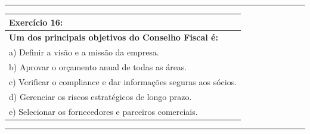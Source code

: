\documentclass[
]{book}
\begin{document}
\begin{center}\rule{0.5\linewidth}{0.5pt}\end{center}

\begin{longtable}[]{@{}l@{}}
\toprule\noalign{}
\textbf{Exercício 16:} \\
\midrule\noalign{}
\endhead
\bottomrule\noalign{}
\endlastfoot
\textbf{Um dos principais objetivos do Conselho Fiscal é:} \\
a) Definir a visão e a missão da empresa. \\
b) Aprovar o orçamento anual de todas as áreas. \\
c) Verificar o compliance e dar informações seguras aos sócios. \\
d) Gerenciar os riscos estratégicos de longo prazo. \\
e) Selecionar os fornecedores e parceiros comerciais. \\
\end{longtable}

\begin{center}\rule{0.5\linewidth}{0.5pt}\end{center}
\end{document}
